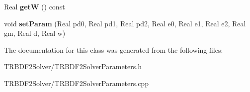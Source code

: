 \begin{DoxyCompactItemize}
\item 
\hypertarget{classTRBDF2SolverParameters_ae1d53917ac10e1b0472a6c5b057c9b32}{
Real {\bfseries getW} () const }
\label{classTRBDF2SolverParameters_ae1d53917ac10e1b0472a6c5b057c9b32}

\item 
\hypertarget{classTRBDF2SolverParameters_a3420dd67088ff3f7074e0920449d128c}{
void {\bfseries setParam} (Real pd0, Real pd1, Real pd2, Real e0, Real e1, Real e2, Real gm, Real d, Real w)}
\label{classTRBDF2SolverParameters_a3420dd67088ff3f7074e0920449d128c}

\end{DoxyCompactItemize}


The documentation for this class was generated from the following files:\begin{DoxyCompactItemize}
\item 
TRBDF2Solver/TRBDF2SolverParameters.h\item 
TRBDF2Solver/TRBDF2SolverParameters.cpp\end{DoxyCompactItemize}

